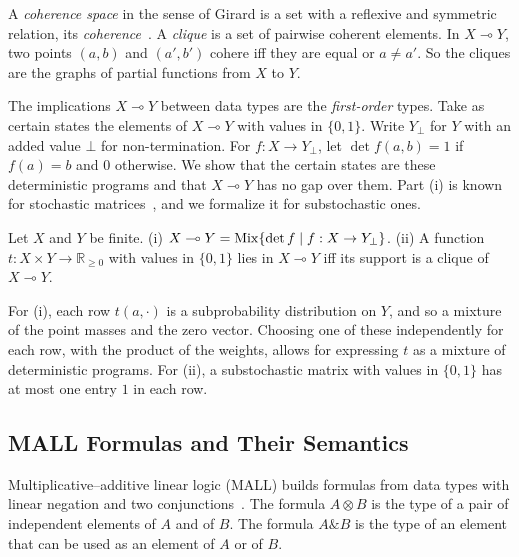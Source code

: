 A \emph{coherence space} in the sense of Girard is a set with a reflexive
and symmetric relation, its \emph{coherence}~\cite{girard1987}. A
\emph{clique} is a set of pairwise coherent elements. In
$X \multimap Y$, two points $(a, b)$ and $(a', b')$ cohere iff they are
equal or $a \ne a'$. So the cliques are the graphs of partial functions
from $X$ to $Y$.

The implications $X \multimap Y$ between data types are the
\emph{first-order} types. Take as certain states the elements of
$X \multimap Y$ with values in $\{0,1\}$. Write $Y_{\bot}$ for $Y$ with
an added value $\bot$ for non-termination. For $f : X \to Y_{\bot}$, let $\det f(a, b) = 1$ if $f(a) = b$ and $0$ otherwise. We show that the
certain states are these deterministic programs and that
$X \multimap Y$ has no gap over them. Part (i) is known for stochastic
matrices~\cite[Prop.~1.5]{levin-peres-wilmer2009}, and we formalize it
for substochastic ones.

\begin{proposition}
\label{prop:first-order}
Let $X$ and $Y$ be finite.
(i) $X \multimap Y = \mathrm{Mix}\{\det f \mid f : X \to Y_{\bot}\}$.
(ii) A function $t : X \times Y \to \mathbb{R}_{\ge 0}$ with values in
$\{0,1\}$ lies in $X \multimap Y$ iff its support is a clique of
$X \multimap Y$.
\end{proposition}

\noindent
For (i), each row $t(a, \cdot)$ is a
subprobability distribution on $Y$, and so a mixture of the point masses
and the zero vector. Choosing one of these independently for each row,
with the product of the weights, allows for expressing 
$t$ as a mixture of deterministic
programs. For (ii), a substochastic matrix with values in $\{0,1\}$ has
at most one entry $1$ in each row.

\subsection{MALL Formulas and Their Semantics}
\label{sec:linear-mall}

Multiplicative--additive linear logic (MALL) builds formulas from data
types with linear negation and two conjunctions~\cite{girard1987}. The
formula $A \otimes B$ is the type of a pair of independent elements of $A$
and of $B$. The formula $A \mathbin{\&} B$ is the type of an element that can be used
as an element of $A$ or of $B$.

